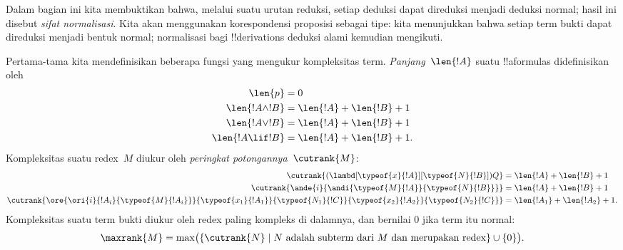 \documentclass[../../../include/open-logic-section]{subfiles}
\begin{document}


Dalam bagian ini kita membuktikan bahwa, melalui suatu urutan reduksi,
setiap deduksi dapat direduksi menjadi deduksi normal; hasil ini disebut
\emph{sifat normalisasi}. Kita akan menggunakan korespondensi proposisi
sebagai tipe: kita menunjukkan bahwa setiap term bukti dapat direduksi
menjadi bentuk normal; normalisasi bagi !!{derivation}s deduksi alami
kemudian mengikuti.

Pertama-tama kita mendefinisikan beberapa fungsi yang mengukur
kompleksitas term. \emph{Panjang}~$\len{!A}$ suatu !!a{formula}s didefinisikan
oleh
\begin{align*}
  \len{p} &= 0\\
  \len{!A \land !B} &= \len{!A} + \len{!B} + 1\\
  \len{!A \lor !B} &= \len{!A} + \len{!B} + 1 \\
  \len{!A \lif !B} &= \len{!A} + \len{!B} + 1.
\end{align*}
Kompleksitas suatu redex~$M$ diukur oleh \emph{peringkat
potongannya}~$\cutrank{M}$:
\begin{align*}
  \cutrank{(\lambd[\typeof{x}{!A}][\typeof{N}{!B}])Q} &=
  \len{!A} + \len{!B} + 1 \\
  \cutrank{\ande{i}{\andi{\typeof{M}{!A}}{\typeof{N}{!B}}}} &=
  \len{!A} + \len{!B} + 1 \\
  \cutrank{\ore{\ori{i}{!A_{i}}{\typeof{M}{!A_i}}}
    {\typeof{x_1}{!A_1}}{\typeof{N_1}{!C}}
    {\typeof{x_2}{!A_2}}{\typeof{N_2}{!C}}} &=
  \len{!A_1} + \len{!A_2} + 1.
\end{align*}
Kompleksitas suatu term bukti diukur oleh redex paling kompleks di
dalamnya, dan bernilai $0$ jika term itu normal:
\[
  \maxrank{M} = \max \bigl(\{\cutrank{N} \mid
    N \text{ adalah subterm dari } M
    \text{ dan merupakan redex}\} \cup \{0\}\bigr).
\]
\end{document}
